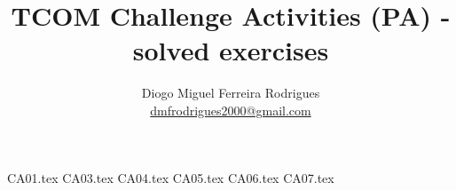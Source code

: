 \documentclass[a4paper]{article}
\title{TCOM Challenge Activities (PA) - solved exercises}
\author{Diogo Miguel Ferreira Rodrigues \\ \href{mailto:dmfrodrigues2000@gmail.com}{dmfrodrigues2000@gmail.com}}
\date{}
\begin{document}
\begingroup
	\maketitle
	\let\clearpage\relax
	\setcounter{tocdepth}{2}
	\tableofcontents
\endgroup
{CA01.tex}
{CA03.tex}
{CA04.tex}
{CA05.tex}
{CA06.tex}
{CA07.tex}
\end{document}
